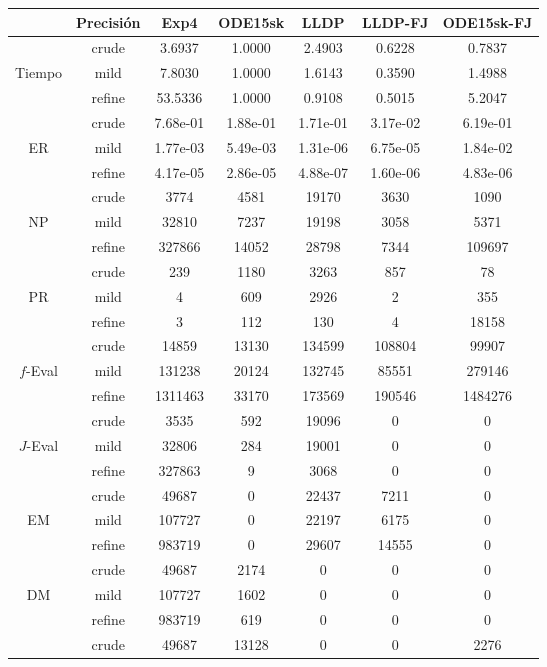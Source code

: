 \begin{table}[htb]
	\centering
\begin{tabular}{ |c|c|c|c|c|c|c| }
\hline
 & Precisi\'on & Exp4 & ODE15sk & LLDP & LLDP-FJ & ODE15sk-FJ \\
\hline
  & crude & 3.6937 & 1.0000 & 2.4903 & 0.6228 & 0.7837 \\
 Tiempo  & mild & 7.8030 & 1.0000 & 1.6143 & 0.3590 & 1.4988 \\
  & refine & 53.5336 & 1.0000 & 0.9108 & 0.5015 & 5.2047 \\
\hline
  & crude & 7.68e-01 & 1.88e-01 & 1.71e-01 & 3.17e-02 & 6.19e-01 \\
 ER  & mild & 1.77e-03 & 5.49e-03 & 1.31e-06 & 6.75e-05 & 1.84e-02 \\
  & refine & 4.17e-05 & 2.86e-05 & 4.88e-07 & 1.60e-06 & 4.83e-06 \\
\hline
  & crude & 3774 & 4581 & 19170 & 3630 & 1090 \\
 NP  & mild & 32810 & 7237 & 19198 & 3058 & 5371 \\
  & refine & 327866 & 14052 & 28798 & 7344 & 109697 \\
\hline
  & crude & 239 & 1180 & 3263 & 857 & 78 \\
 PR  & mild & 4 & 609 & 2926 & 2 & 355 \\
  & refine & 3 & 112 & 130 & 4 & 18158 \\
\hline
  & crude & 14859 & 13130 & 134599 & 108804 & 99907 \\
 $f$-Eval  & mild & 131238 & 20124 & 132745 & 85551 & 279146 \\
  & refine & 1311463 & 33170 & 173569 & 190546 & 1484276 \\
\hline
  & crude & 3535 & 592 & 19096 & 0 & 0 \\
 $J$-Eval  & mild & 32806 & 284 & 19001 & 0 & 0 \\
  & refine & 327863 & 9 & 3068 & 0 & 0 \\
\hline
  & crude &  49687 & 0 & 22437 & 7211 & 0 \\
 EM  & mild & 107727 & 0 & 22197 & 6175 & 0 \\
  & refine & 983719 & 0 & 29607 & 14555 & 0 \\
\hline
  & crude & 49687 & 2174 & 0 & 0 & 0 \\
 DM  & mild & 107727 & 1602 & 0 & 0 & 0 \\
  & refine & 983719 & 619 & 0 & 0 & 0 \\
\hline
  & crude & 49687 & 13128 & 0 & 0 & 2276 \\

\end{tabular}
\end{table}
